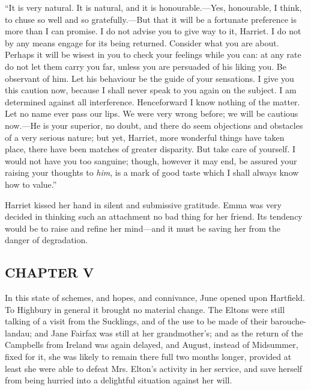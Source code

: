 

“It is very natural. It is natural, and it is honourable.---Yes, honourable, I think, to chuse so well and so gratefully.---But that it will be a fortunate preference is more than I can promise. I do not advise you to give way to it, Harriet. I do not by any means engage for its being returned. Consider what you are about. Perhaps it will be wisest in you to check your feelings while you can: at any rate do not let them carry you far, unless you are persuaded of his liking you. Be observant of him. Let his behaviour be the guide of your sensations. I give you this caution now, because I shall never speak to you again on the subject. I am determined against all interference. Henceforward I know nothing of the matter. Let no name ever pass our lips. We were very wrong before; we will be cautious now.---He is your superior, no doubt, and there do seem objections and obstacles of a very serious nature; but yet, Harriet, more wonderful things have taken place, there have been matches of greater disparity. But take care of yourself. I would not have you too sanguine; though, however it may end, be assured your raising your thoughts to {\em him}, is a mark of good taste which I shall always know how to value.”

Harriet kissed her hand in silent and submissive gratitude. Emma was very decided in thinking such an attachment no bad thing for her friend. Its tendency would be to raise and refine her mind---and it must be saving her from the danger of degradation.

\subsection[chapter-v-2]{\useURL[url43][][][]\from[url43]CHAPTER V}

In this state of schemes, and hopes, and connivance, June opened upon Hartfield. To Highbury in general it brought no material change. The Eltons were still talking of a visit from the Sucklings, and of the use to be made of their barouche-landau; and Jane Fairfax was still at her grandmother's; and as the return of the Campbells from Ireland was again delayed, and August, instead of Midsummer, fixed for it, she was likely to remain there full two months longer, provided at least she were able to defeat Mrs. Elton's activity in her service, and save herself from being hurried into a delightful situation against her will.

